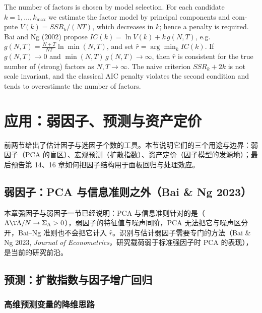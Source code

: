 \begin{english}
The number of factors is chosen by model selection. For each candidate $k=1,\dots,k_{\max}$ we estimate the factor model by principal components and compute $V(k)=SSR_k/(NT)$, which decreases in $k$; hence a penalty is required. Bai and Ng (2002) propose $IC(k)=\ln V(k)+k\,g(N,T)$, e.g.\ $g(N,T)=\frac{N+T}{NT}\ln\min(N,T)$, and set $\hat r=\arg\min_kIC(k)$. If $g(N,T)\to0$ and $\min(N,T)\,g(N,T)\to\infty$, then $\hat r$ is consistent for the true number of (strong) factors as $N,T\to\infty$. The naive criterion $SSR_k+2k$ is not scale invariant, and the classical AIC penalty violates the second condition and tends to overestimate the number of factors.
\end{english}

\section{应用：弱因子、预测与资产定价}\label{sec:U13b-app}

前两节给出了估计因子与选因子个数的工具。本节说明它们的三个用途与边界：弱因子（PCA 的盲区）、宏观预测（扩散指数）、资产定价（因子模型的发源地）；最后预告第 14、16 章如何把因子结构用于面板回归与处理效应。

\subsection{弱因子：PCA 与信息准则之外（Bai \& Ng 2023）}

本章强因子与弱因子一节已经说明：PCA 与信息准则针对的是（$\Lambda\T\Lambda/N\to\Sigma_\Lambda>0$），弱因子的特征值与噪声同阶，PCA 无法把它与噪声区分开，Bai--Ng 准则也不会把它计入 $\hat r$。识别与估计弱因子需要专门的方法（Bai \& Ng 2023, \emph{Journal of Econometrics}，研究载荷弱于标准强因子时 PCA 的表现），是当前的研究前沿。

\subsection{预测：扩散指数与因子增广回归}

\subsubsection{高维预测变量的降维思路}

